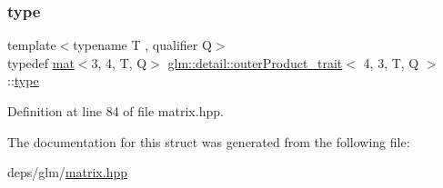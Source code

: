 \subsubsection{\texorpdfstring{type}{type}}
{\footnotesize\ttfamily template$<$typename T , qualifier Q$>$ \\
typedef \hyperlink{structglm_1_1mat}{mat}$<$3, 4, T, Q$>$ \hyperlink{structglm_1_1detail_1_1outerProduct__trait}{glm\+::detail\+::outer\+Product\+\_\+trait}$<$ 4, 3, T, Q $>$\+::\hyperlink{structglm_1_1mat_3_013_00_014_00_01T_00_01Q_01_4}{type}}



Definition at line 84 of file matrix.\+hpp.



The documentation for this struct was generated from the following file\+:\begin{DoxyCompactItemize}
\item 
deps/glm/\hyperlink{matrix_8hpp}{matrix.\+hpp}\end{DoxyCompactItemize}
